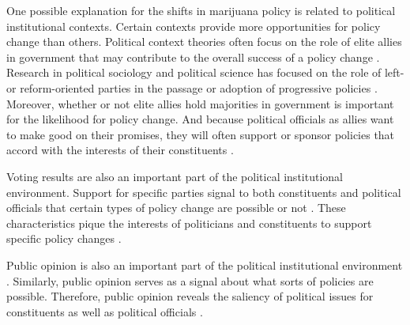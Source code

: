 One possible explanation for the shifts in marijuana policy is related to political institutional contexts. Certain contexts provide more opportunities for policy change than others. Political context theories often focus on the role of elite allies in government that may contribute to the overall success of a policy change \citep{amenta_et_al_1994,amenta_2006}. Research in political sociology and political science has focused on the role of left- or reform-oriented parties in the passage or adoption of progressive policies \citep{amenta_and_elliott_2019,amenta_et_al_2005,korpi_1983}. Moreover, whether or not elite allies hold majorities in government is important for the likelihood for policy change\citep{ansolabehere_and_snyder2006,winters_1976,abramowitz_1983,campagna_and_grofman_1990}. And because political officials as allies want to make good on their promises, they will often support or sponsor policies that accord with the interests of their constituents \citep{page_and_shapiro_1983,mayhew_1974,downs_1957,stimson_et_al_1995}. 

Voting results are also an important part of the political institutional environment. Support for specific parties signal to both constituents and political officials that certain types of policy change are possible or not \citep{amenta_and_elliott_2019}. These characteristics pique the interests of politicians and constituents to support specific policy changes \citep{berry_and_berry_1990,boushey_2016}. 

Public opinion is also an important part of the political institutional environment \citep{burstein_1998,burstein_2003}. Similarly, public opinion serves as a signal about what sorts of policies are possible. Therefore, public opinion reveals the saliency of political issues for constituents as well as political officials \citep{pacheco_2012,nicholson-crotty_2009}.




